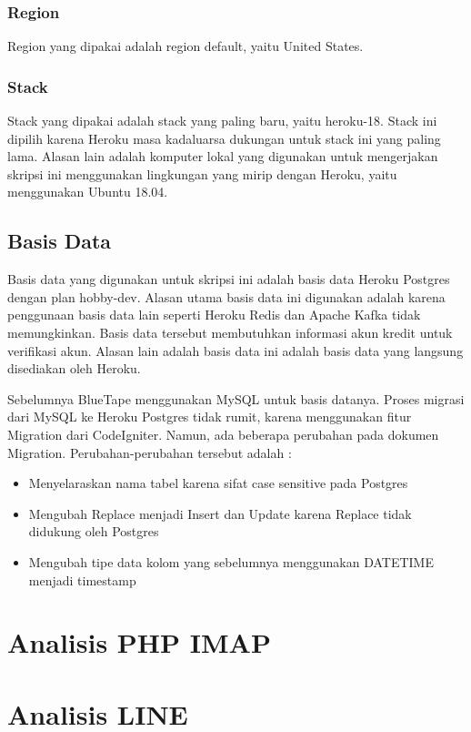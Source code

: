 \subsubsection{Region}
Region yang dipakai adalah region default, yaitu United States.

\subsubsection{Stack}
Stack yang dipakai adalah stack yang paling baru, yaitu heroku-18. Stack ini dipilih karena Heroku masa kadaluarsa dukungan untuk stack ini yang paling lama. Alasan lain adalah komputer lokal yang digunakan untuk mengerjakan skripsi ini menggunakan lingkungan yang mirip dengan Heroku, yaitu menggunakan Ubuntu 18.04.

\subsection{Basis Data}
Basis data yang digunakan untuk skripsi ini adalah basis data Heroku Postgres dengan plan hobby-dev. Alasan utama basis data ini digunakan adalah karena penggunaan basis data lain seperti Heroku Redis dan Apache Kafka tidak memungkinkan. Basis data tersebut membutuhkan informasi akun kredit untuk verifikasi akun. Alasan lain adalah basis data ini adalah basis data yang langsung disediakan oleh Heroku.

Sebelumnya BlueTape menggunakan MySQL untuk basis datanya. Proses migrasi dari MySQL ke Heroku Postgres tidak rumit, karena menggunakan fitur Migration dari CodeIgniter. Namun, ada beberapa perubahan pada dokumen Migration. Perubahan-perubahan tersebut adalah :
\begin{itemize}
\item Menyelaraskan nama tabel karena sifat case sensitive pada Postgres
\item Mengubah Replace menjadi Insert dan Update karena Replace tidak didukung oleh Postgres
\item Mengubah tipe data kolom yang sebelumnya menggunakan DATETIME menjadi timestamp
\end{itemize}  

\section{Analisis PHP IMAP}
\label{sec:analisisimap}

\section{Analisis LINE}
\label{sec:analisisline}